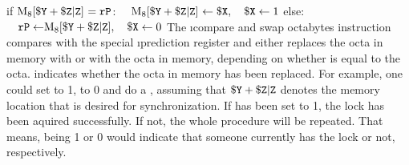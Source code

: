 \instrtblfour
	{}
	{if $\vmem{8}{\dr{Y} + \udrim{Z}}~= \sr{P}$:}
	{$\quad \vmem{8}{\dr{Y} + \udrim{Z}}~\leftarrow \dr{X},\quad \dr{X} \leftarrow 1$}
	{else:}
	{$\quad \sr{P} \leftarrow \vmem{8}{\dr{Y} + \udrim{Z}},\quad \dr{X} \leftarrow 0$}
\noindent The \i{compare and swap octabytes} instruction compares  with the special \i{prediction register}  and either replaces the octa in memory with  or  with the octa in memory, depending on whether  is equal to the octa.  indicates whether the octa in memory has been replaced. \citep[pg. 25]{mmix-doc} For example, one could set  to 1,  to 0 and do a , assuming that ${\tt \$Y} + {\tt \$Z}{\tt|Z}$ denotes the memory location that is desired for synchronization. If  has been set to 1, the lock has been aquired successfully. If not, the whole procedure will be repeated. That means,  being 1 or 0 would indicate that someone currently has the lock or not, respectively.

